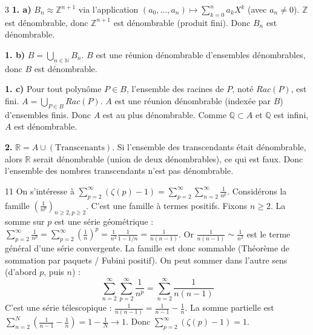 \begin{correction}{3}
\textbf{1. a)} $B_n \approx \mathbb{Z}^{n+1}$ via l'application $(a_0, \dots, a_n) \mapsto \sum_{k=0}^n a_k X^k$ (avec $a_n \neq 0$).
$\mathbb{Z}$ est dénombrable, donc $\mathbb{Z}^{n+1}$ est dénombrable (produit fini).
Donc $B_n$ est dénombrable.

\textbf{1. b)} $B = \bigcup_{n \in \mathbb{N}} B_n$.
$B$ est une réunion dénombrable d'ensembles dénombrables, donc $B$ est dénombrable.

\textbf{1. c)} Pour tout polynôme $P \in B$, l'ensemble des racines de $P$, noté $Rac(P)$, est fini.
$A = \bigcup_{P \in B} Rac(P)$.
$A$ est une réunion dénombrable (indexée par $B$) d'ensembles finis.
Donc $A$ est au plus dénombrable. Comme $\mathbb{Q} \subset A$ et $\mathbb{Q}$ est infini, $A$ est dénombrable.

\textbf{2.} $\mathbb{R} = A \cup (\text{Transcenants})$.
Si l'ensemble des transcendants était dénombrable, alors $\mathbb{R}$ serait dénombrable (union de deux dénombrables), ce qui est faux.
Donc l'ensemble des nombres transcendants n'est pas dénombrable.
\end{correction}

\begin{correction}{11}
On s'intéresse à $\sum_{p=2}^\infty (\zeta(p)-1) = \sum_{p=2}^\infty \sum_{n=2}^\infty \frac{1}{n^p}$.
Considérons la famille $(\frac{1}{n^p})_{n\ge2, p\ge2}$.
C'est une famille à termes positifs.
Fixons $n \ge 2$. La somme sur $p$ est une série géométrique :
$\sum_{p=2}^\infty \frac{1}{n^p} = \sum_{p=2}^\infty (\frac{1}{n})^p = \frac{1}{n^2} \frac{1}{1-1/n} = \frac{1}{n(n-1)}$.
Or $\frac{1}{n(n-1)} \sim \frac{1}{n^2}$ est le terme général d'une série convergente.
La famille est donc sommable (Théorème de sommation par paquets / Fubini positif).
On peut sommer dans l'autre sens (d'abord $p$, puis $n$) :
$$ \sum_{n=2}^\infty \sum_{p=2}^\infty \frac{1}{n^p} = \sum_{n=2}^\infty \frac{1}{n(n-1)} $$
C'est une série télescopique : $\frac{1}{n(n-1)} = \frac{1}{n-1} - \frac{1}{n}$.
La somme partielle est $\sum_{n=2}^N (\frac{1}{n-1} - \frac{1}{n}) = 1 - \frac{1}{N} \to 1$.
Donc $\sum_{p=2}^\infty (\zeta(p)-1) = 1$.
\end{correction}

